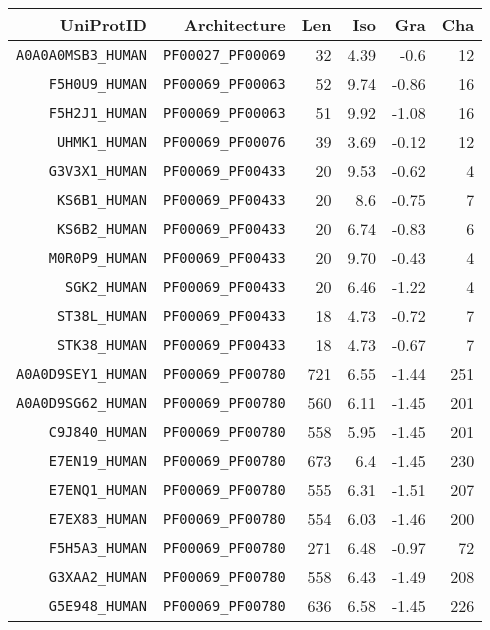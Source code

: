 \begin{longtable}[c]{||r|r|r|r|r|r||}
  \hline
  UniProtID & Architecture & Len & Iso & Gra & Cha \\
  \hline\hline
  \texttt{A0A0A0MSB3\_HUMAN} & \texttt{PF00027\_PF00069} & 32 & 4.39 & -0.6 & 12 \\
  \hline
  \texttt{F5H0U9\_HUMAN} & \texttt{PF00069\_PF00063} & 52 & 9.74 & -0.86 & 16 \\
  \hline
  \texttt{F5H2J1\_HUMAN} & \texttt{PF00069\_PF00063} & 51 & 9.92 & -1.08 & 16 \\
  \hline
  \texttt{UHMK1\_HUMAN} & \texttt{PF00069\_PF00076} & 39 & 3.69 & -0.12 & 12 \\
  \hline
  \texttt{G3V3X1\_HUMAN} & \texttt{PF00069\_PF00433} & 20 & 9.53 & -0.62 & 4 \\
  \hline
  \texttt{KS6B1\_HUMAN} & \texttt{PF00069\_PF00433} & 20 & 8.6 & -0.75 & 7 \\
  \hline
  \texttt{KS6B2\_HUMAN} & \texttt{PF00069\_PF00433} & 20 & 6.74 & -0.83 & 6 \\
  \hline
  \texttt{M0R0P9\_HUMAN} & \texttt{PF00069\_PF00433} & 20 & 9.70 & -0.43 & 4 \\
  \hline
  \texttt{SGK2\_HUMAN} & \texttt{PF00069\_PF00433} & 20 & 6.46 & -1.22 & 4 \\
  \hline
  \texttt{ST38L\_HUMAN} & \texttt{PF00069\_PF00433} & 18 & 4.73 & -0.72 & 7 \\
  \hline
  \texttt{STK38\_HUMAN} & \texttt{PF00069\_PF00433} & 18 & 4.73 & -0.67 & 7 \\
  \hline
  \texttt{A0A0D9SEY1\_HUMAN} & \texttt{PF00069\_PF00780} & 721 & 6.55 & -1.44 & 251 \\
  \hline
  \texttt{A0A0D9SG62\_HUMAN} & \texttt{PF00069\_PF00780} & 560 & 6.11 & -1.45 & 201 \\
  \hline
  \texttt{C9J840\_HUMAN} & \texttt{PF00069\_PF00780} & 558 & 5.95 & -1.45 & 201 \\
  \hline
  \texttt{E7EN19\_HUMAN} & \texttt{PF00069\_PF00780} & 673 & 6.4 & -1.45 & 230 \\
  \hline
  \texttt{E7ENQ1\_HUMAN} & \texttt{PF00069\_PF00780} & 555 & 6.31 & -1.51 & 207 \\
  \hline
  \texttt{E7EX83\_HUMAN} & \texttt{PF00069\_PF00780} & 554 & 6.03 & -1.46 & 200 \\
  \hline
  \texttt{F5H5A3\_HUMAN} & \texttt{PF00069\_PF00780} & 271 & 6.48 & -0.97 & 72 \\
  \hline
  \texttt{G3XAA2\_HUMAN} & \texttt{PF00069\_PF00780} & 558 & 6.43 & -1.49 & 208 \\
  \hline
  \texttt{G5E948\_HUMAN} & \texttt{PF00069\_PF00780} & 636 & 6.58 & -1.45 & 226 \\

\end{longtable}
